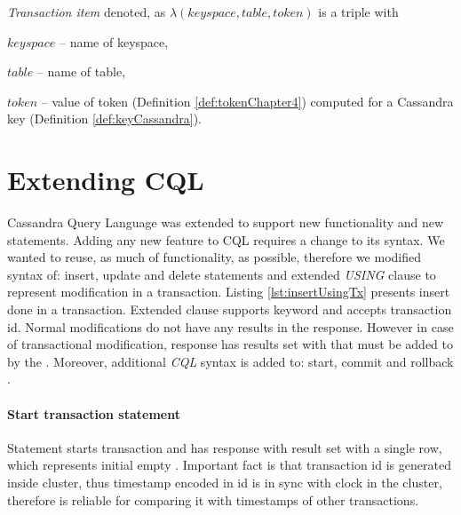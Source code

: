 \begin{definition}
\label{def:transactionItemChapter4}
\emph{Transaction item} denoted, as $\lambda(\mathit{keyspace}, \mathit{table}, \mathit{token})$ is a triple with \begin{enumerate*}
\item $\mathit{keyspace}$ -- name of keyspace,
\item $\mathit{table}$ -- name of table,
\item $\mathit{token}$ -- value of token (Definition \ref{def:tokenChapter4}) computed for a Cassandra key (Definition \ref{def:keyCassandra}).
\end{enumerate*}
\end{definition}






\section{Extending CQL}
Cassandra Query Language was extended to support new functionality and new statements. Adding any new feature to CQL requires a change to its syntax. We wanted to reuse, as much of functionality, as possible, therefore we modified syntax of: insert, update and delete statements and extended \emph{USING} clause to represent modification in a transaction. Listing \ref{lst:insertUsingTx} presents insert done in a transaction. Extended  clause supports  keyword and accepts transaction id. Normal modifications do not have any results in the response. However in case of transactional modification, response has results set with \txItem that must be added to \txState by the \client. Moreover, additional \emph{CQL} syntax is added to: start, commit and rollback \transaction.

\paragraph{Start transaction statement} 
Statement starts transaction and has response with result set with a single row, which represents initial empty \txState. 
 Important fact is that transaction id is generated inside cluster, thus timestamp encoded in id is in sync with clock in the cluster, therefore is reliable for comparing it with timestamps of other transactions.

